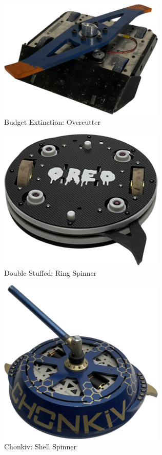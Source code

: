 \documentclass[conference]{IEEEtran}
\begin{document}
\begin{figure}[htp]
\centering
\includegraphics[scale=0.4]{budgetextinction.png}
\caption{Budget Extinction: Overcutter \cite{b2}}
\label{Budget Extinction: Overcutter}
\end{figure}

\begin{figure}[htp]
\centering
\includegraphics[scale=0.4]{doublestuffed.png}
\caption{Double Stuffed: Ring Spinner \cite{b2}}
\label{Double Stuffed: Ring Spinner}
\end{figure}

\begin{figure}[htp]
\centering
\includegraphics[scale=0.4]{chonkiv.png}
\caption{Chonkiv: Shell Spinner \cite{b2}}
\label{Chonkiv: Shell Spinner}
\end{figure}
\newpage
\end{document}
